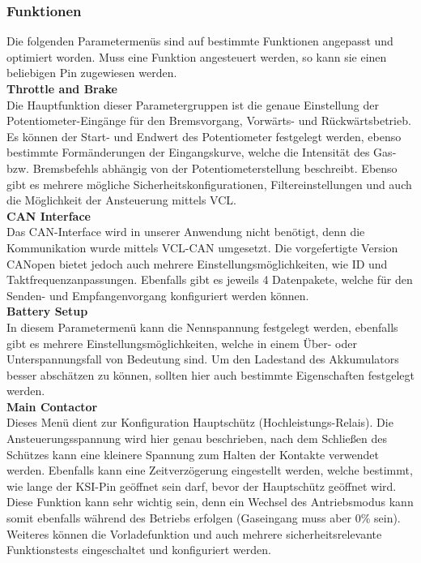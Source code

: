 \subsubsection{Funktionen}
Die folgenden Parametermenüs sind auf bestimmte Funktionen angepasst und optimiert worden. Muss eine Funktion angesteuert werden, so kann sie einen beliebigen Pin zugewiesen werden.
\\[4mm] 

\textbf{Throttle and Brake}\\[1mm]
Die Hauptfunktion dieser Parametergruppen ist die genaue Einstellung der Potentiometer-Eingänge für den Bremsvorgang, Vorwärts- und Rückwärtsbetrieb. Es können der Start- und Endwert des Potentiometer festgelegt werden, ebenso bestimmte Formänderungen der Eingangskurve, welche die Intensität des Gas- bzw. Bremsbefehls abhängig von der Potentiometerstellung beschreibt. Ebenso gibt es mehrere mögliche Sicherheitskonfigurationen, Filtereinstellungen und auch die Möglichkeit der Ansteuerung mittels VCL.\\[4mm]

\textbf{CAN Interface}\\[1mm]
Das CAN-Interface wird in unserer Anwendung nicht benötigt, denn die Kommunikation wurde mittels VCL-CAN umgesetzt. Die vorgefertigte Version CANopen bietet jedoch auch mehrere Einstellungsmöglichkeiten, wie ID und Taktfrequenzanpassungen. Ebenfalls gibt es jeweils 4 Datenpakete, welche für den Senden- und Empfangenvorgang konfiguriert werden können.
\\[4mm]

\textbf{Battery Setup}\\[1mm]
In diesem Parametermenü kann die Nennspannung festgelegt werden, ebenfalls gibt es mehrere Einstellungsmöglichkeiten, welche in einem Über- oder Unterspannungsfall von Bedeutung sind. Um den Ladestand des Akkumulators besser abschätzen zu können, sollten hier auch bestimmte Eigenschaften festgelegt werden.
\\[4mm]

\textbf{Main Contactor}\\[1mm]
Dieses Menü dient zur Konfiguration Hauptschütz (Hochleistungs-Relais). Die Ansteuerungsspannung wird hier genau beschrieben, nach dem Schließen des Schützes kann eine kleinere Spannung zum Halten der Kontakte verwendet werden. Ebenfalls kann eine Zeitverzögerung eingestellt werden, welche bestimmt, wie lange der KSI-Pin geöffnet sein darf, bevor der Hauptschütz geöffnet wird. Diese Funktion kann sehr wichtig sein, denn ein Wechsel des Antriebsmodus kann somit ebenfalls während des Betriebs erfolgen (Gaseingang muss aber 0\% sein). Weiteres können die Vorladefunktion und auch mehrere sicherheitsrelevante Funktionstests eingeschaltet und konfiguriert werden.
\\[4mm]

